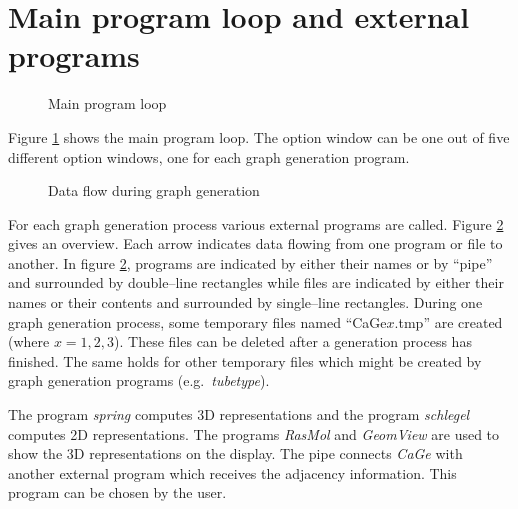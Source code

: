 \documentclass[a4paper]{article}
\def\CaGe{\textit{CaGe}}
\begin{document}
\section{Main program loop and external programs}
\begin{figure}[thb]
\begin{center}
\caption{\label{Main program loop}Main program loop}
\end{center}
\end{figure}
Figure \ref{Main program loop} shows the main program loop. The option window
can be one out of five different option windows, one for each graph generation
program. 
\begin{figure}[thb]
\begin{center}
\caption{\label{CaGeprograms}Data flow during graph generation}
\end{center}
\end{figure}
For each graph generation process various external programs are called. Figure
\ref{CaGeprograms} gives an overview. Each arrow indicates data flowing from
one program or file to another. In figure \ref{CaGeprograms}, programs are
indicated by either their names or by ``pipe'' and surrounded by double--line
rectangles while files are
indicated by either their names or their contents and surrounded by 
single--line rectangles. During one graph generation process, some temporary
files named ``CaGe$x$.tmp'' are created (where $x=1,2,3$). These files can
be deleted after a generation process has finished. The same holds for other
temporary files which might be created by graph generation programs 
(e.g.~\textit{tubetype}). 

The program \textit{spring} computes 3D representations and the program 
\textit{schlegel} computes 2D representations. The programs \textit{RasMol}
and \textit{GeomView} are used to show the 3D representations on the display.
The pipe connects \CaGe{} with another external program which receives the
adjacency information. This program can be chosen by the user.
\end{document}
